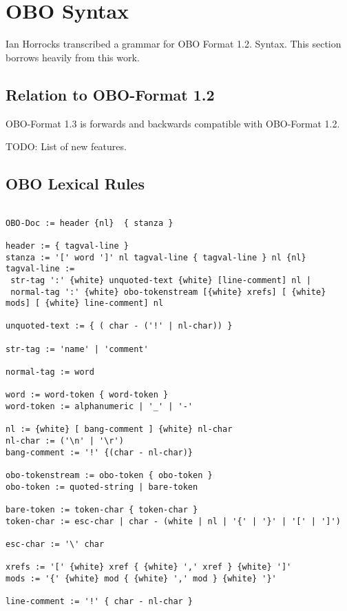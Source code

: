 \section{OBO Syntax}

Ian Horrocks transcribed a grammar for OBO Format 1.2. Syntax. This section borrows heavily from this work.

\subsection{Relation to OBO-Format 1.2}

OBO-Format 1.3 is forwards and backwards compatible with OBO-Format 1.2.

TODO: List of new features.

\subsection{OBO Lexical Rules}

\begin{verbatim}

OBO-Doc := header {nl}  { stanza }

header := { tagval-line }
stanza := '[' word ']' nl tagval-line { tagval-line } nl {nl}
tagval-line := 
 str-tag ':' {white} unquoted-text {white} [line-comment] nl |
 normal-tag ':' {white} obo-tokenstream [{white} xrefs] [ {white} mods] [ {white} line-comment] nl

unquoted-text := { ( char - ('!' | nl-char)) }

str-tag := 'name' | 'comment'

normal-tag := word

word := word-token { word-token }
word-token := alphanumeric | '_' | '-' 

nl := {white} [ bang-comment ] {white} nl-char
nl-char := ('\n' | '\r')
bang-comment := '!' {(char - nl-char)}

obo-tokenstream := obo-token { obo-token }
obo-token := quoted-string | bare-token

bare-token := token-char { token-char }
token-char := esc-char | char - (white | nl | '{' | '}' | '[' | ']')

esc-char := '\' char

xrefs := '[' {white} xref { {white} ',' xref } {white} ']'
mods := '{' {white} mod { {white} ',' mod } {white} '}'

line-comment := '!' { char - nl-char }

\end{verbatim}


